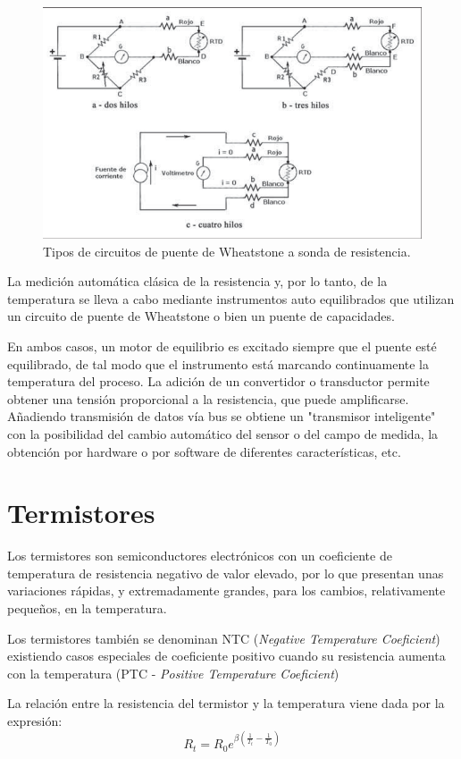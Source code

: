 \begin{figure}[H]
    \centering
    \includegraphics[width=0.5\linewidth]{Imagenes/Termometros de resistencia.png}
    \caption{Tipos de circuitos de puente de Wheatstone a sonda de resistencia.}
\end{figure}

La medición automática clásica de la resistencia y, por lo tanto, de la temperatura se lleva a cabo mediante instrumentos auto equilibrados que utilizan un circuito de puente de Wheatstone o bien un puente de capacidades.

En ambos casos, un motor de equilibrio es excitado siempre que el puente esté equilibrado, de tal modo que el instrumento está marcando continuamente la temperatura del proceso.
La adición de un convertidor o transductor permite obtener una tensión proporcional a la resistencia, que puede amplificarse. Añadiendo transmisión de datos vía bus se obtiene un "transmisor inteligente" con la posibilidad del cambio automático del sensor o del campo de medida, la obtención por hardware o por software de diferentes características, etc.
\section{Termistores}
Los termistores son semiconductores electrónicos con un coeficiente de temperatura de resistencia negativo de valor elevado, por lo que presentan unas variaciones rápidas, y extremadamente grandes, para los cambios, relativamente pequeños, en la temperatura.

Los termistores también se denominan NTC (\textit{Negative Temperature Coeficient}) existiendo casos especiales de coeficiente positivo cuando su resistencia aumenta con la temperatura (PTC - \textit{Positive Temperature Coeficient})

La relación entre la resistencia del termistor y la temperatura viene dada por la expresión:
\begin{equation}
    R_t = R_0 e^{\beta \left( \frac{1}{T_t} - \frac{1}{T_0} \right)}
\end{equation}

